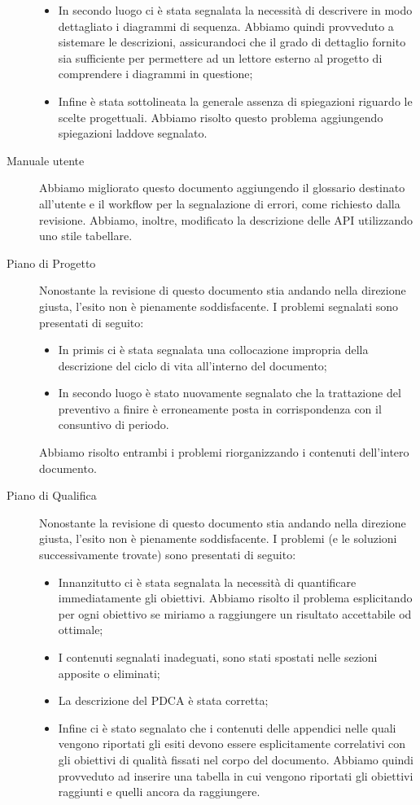 \begin{description}
\begin{itemize}
                \item In secondo luogo ci è stata segnalata la necessità di descrivere in modo dettagliato i diagrammi di sequenza. Abbiamo quindi provveduto a sistemare le descrizioni, assicurandoci che il grado di dettaglio fornito sia sufficiente per permettere ad un lettore esterno al progetto di comprendere i diagrammi in questione;
                \item Infine è stata sottolineata la generale assenza di spiegazioni riguardo le scelte progettuali. Abbiamo risolto questo problema aggiungendo spiegazioni laddove segnalato.
            \end{itemize}
    \item[Manuale utente] Abbiamo migliorato questo documento aggiungendo il glossario destinato all'utente e il workflow per la segnalazione di errori, come richiesto dalla revisione. Abbiamo, inoltre, modificato la descrizione delle API utilizzando uno stile tabellare.
    \item[Piano di Progetto] Nonostante la revisione di questo documento stia andando nella direzione giusta, l'esito non è pienamente soddisfacente. I problemi segnalati sono presentati di seguito:
            \begin{itemize}
                \item In primis ci è stata segnalata una collocazione impropria della descrizione del ciclo di vita all'interno del documento;
                \item In secondo luogo è stato nuovamente segnalato che la trattazione del preventivo a finire è erroneamente posta in corrispondenza con il consuntivo di periodo.
            \end{itemize}
            Abbiamo risolto entrambi i problemi riorganizzando i contenuti dell'intero documento.
    \item[Piano di Qualifica] Nonostante la revisione di questo documento stia andando nella direzione giusta, l'esito non è pienamente soddisfacente. I problemi (e le soluzioni successivamente trovate) sono presentati di seguito:
            \begin{itemize}
               \item Innanzitutto ci è stata segnalata la necessità di quantificare immediatamente gli obiettivi. Abbiamo risolto il problema esplicitando per ogni obiettivo se miriamo a raggiungere un risultato accettabile od ottimale;
               \item I contenuti segnalati inadeguati, sono stati spostati nelle sezioni apposite o eliminati;
               \item La descrizione del PDCA è stata corretta;
               \item Infine ci è stato segnalato che i contenuti delle appendici nelle quali vengono riportati gli esiti devono essere esplicitamente correlativi con gli obiettivi di qualità fissati nel corpo del documento. Abbiamo quindi provveduto ad inserire una tabella in cui vengono riportati gli obiettivi raggiunti e quelli ancora da raggiungere.
            \end{itemize}
    \end{description}
